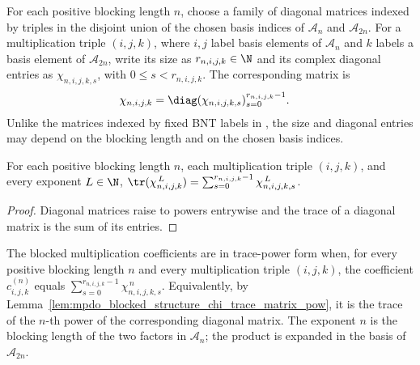 \begin{definition}%
    \label{def:mpdo_blocked_structure_chi_family}
    \leanok
    For each positive blocking length $n$, choose a family of diagonal
    matrices indexed by triples in the disjoint union of the chosen basis
    indices of $\mathcal A_n$ and $\mathcal A_{2n}$. For a multiplication
    triple $(i,j,k)$, where $i,j$ label basis elements of $\mathcal A_n$ and
    $k$ labels a basis element of $\mathcal A_{2n}$, write its size as
    $r_{n,i,j,k}\in\N$ and its complex diagonal entries as
    $\chi_{n,i,j,k,s}$, with $0\le s<r_{n,i,j,k}$. The corresponding matrix is
    \begin{align}
        \chi_{n,i,j,k}
         & =
        \diag(\chi_{n,i,j,k,s})_{s=0}^{r_{n,i,j,k}-1}.
        \notag
    \end{align}
    Unlike the matrices indexed by fixed BNT labels in
    \cite[Theorem~4.14(ii)]{Cirac2016MPDO_arXiv}, the size and diagonal
    entries may depend on the blocking length and on the chosen basis indices.
\end{definition}

\begin{lemma}%
    \label{lem:mpdo_blocked_structure_chi_trace_matrix_pow}
    \leanok
    For each positive blocking length $n$, each multiplication triple $(i,j,k)$,
    and every exponent $L\in\N$,
    $\tr(\chi_{n,i,j,k}^{\,L})
        = \sum_{s=0}^{r_{n,i,j,k}-1} \chi_{n,i,j,k,s}^{\,L}$.
\end{lemma}
\begin{proof}\leanok
    Diagonal matrices raise to powers entrywise and the trace of a diagonal
    matrix is the sum of its entries.
\end{proof}

\begin{definition}%
    \label{def:mpdo_has_blocked_structure_chi_trace_power_form}
    \leanok
    The blocked multiplication coefficients are in trace-power form when, for
    every positive blocking length $n$ and every multiplication triple $(i,j,k)$,
    the coefficient $c^{(n)}_{i,j,k}$ equals
    $\sum_{s=0}^{r_{n,i,j,k}-1} \chi_{n,i,j,k,s}^{\,n}$.
    Equivalently, by
    Lemma~\ref{lem:mpdo_blocked_structure_chi_trace_matrix_pow}, it is the
    trace of the $n$-th power of the corresponding diagonal matrix. The exponent
    $n$ is the blocking length of the two factors in $\mathcal A_n$; the
    product is expanded in the basis of $\mathcal A_{2n}$.
\end{definition}

